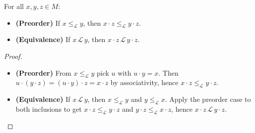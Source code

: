 \begin{lemma}
\label{lem:right-mul-compat-left}
For all \(x,y,z\in M\):
\begin{itemize}
  \item \textbf{(Preorder)} If \(x \le_{\mathcal L} y\), then \(x\cdot z \le_{\mathcal L} y\cdot z\).
  \item \textbf{(Equivalence)} If \(x \,\mathcal L\, y\), then \(x\cdot z \,\mathcal L\, y\cdot z\).
\end{itemize}
\leanok
{}
\end{lemma}
\begin{proof}
\leanok
\begin{itemize}
  \item \textbf{(Preorder)} From \(x \le_{\mathcal L} y\) pick \(u\) with \(u\cdot y = x\). Then
        \(u\cdot (y\cdot z) = (u\cdot y)\cdot z = x\cdot z\) by associativity, hence \(x\cdot z \le_{\mathcal L} y\cdot z\).
  \item \textbf{(Equivalence)} If \(x \,\mathcal L\, y\), then \(x \le_{\mathcal L} y\) and \(y \le_{\mathcal L} x\).
        Apply the preorder case to both inclusions to get \(x\cdot z \le_{\mathcal L} y\cdot z\) and \(y\cdot z \le_{\mathcal L} x\cdot z\),
        hence \(x\cdot z \,\mathcal L\, y\cdot z\).
\end{itemize}
\end{proof}
